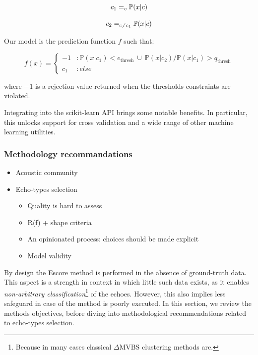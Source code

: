 \documentclass[
  10pt,
  letterpaper,
]{article}
\providecommand{\tightlist}{%
  \setlength{\itemsep}{0pt}\setlength{\parskip}{0pt}}
\let\argmax\relax
\DeclareMathOperator*{\argmax}{arg\,max}
\begin{document}
\[
c_1 = \argmax_c{\mathbb{P}(x|c)}
\]

\[
c_2 = \argmax_{c \neq c_1}{\mathbb{P}(x|c)}
\]

Our model is the prediction function \(f\) such that:

\[
f(x) = \left\{ \begin{array}{ll}
-1 & : \mathbb{P}(x|c_1) < e_{\text{thresh}} \ \cup \ \mathbb{P}(x|c_2) / \mathbb{P}(x|c_1) >  q_{\text{thresh}} \\
c_1 & : else
\end{array} \right.
\]

where \(-1\) is a rejection value returned when the thresholds
constraints are violated.

Integrating into the scikit-learn API brings some notable benefits. In
particular, this unlocks support for cross validation and a wide range
of other machine learning utilities.

\subsubsection{Methodology
recommandations}\label{methodology-recommandations}

\begin{itemize}
\tightlist
\item
  Acoustic community
\item
  Echo-types selection

  \begin{itemize}
  \tightlist
  \item
    Quality is hard to assess
  \item
    R(f) + shape criteria
  \item
    An opinionated process: choices should be made explicit
  \item
    Model validity
  \end{itemize}
\end{itemize}

By design the Escore method is performed in the absence of ground-truth
data. This aspect is a strength in context in which little such data
exists, as it enables \emph{non-arbitrary classification}\footnote{Because
  in many cases classical \(\Delta \text{MVBS}\) clustering methods are.}
of the echoes. However, this also implies less safeguard in case of the
method is poorly executed. In this section, we review the methods
objectives, before diving into methodological recommendations related to
echo-types selection.
\end{document}
